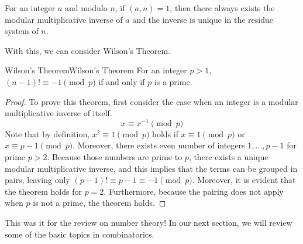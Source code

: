 \documentclass[../../main.tex]{subfiles}
\begin{document}
\begin{important}
For an integer $a$ and modulo $n$, if $(a, n) = 1$, then there
always exists the modular multiplicative inverse of $a$ and the
inverse is unique in the residue system of $n$.
\end{important}

With this, we can consider Wilson's Theorem.

\begin{theorem}{Wilson's Theorem}{Wilson's Theorem}
For an integer $p > 1$, $(n - 1)! \equiv -1 \pmod{p}$ if and only if
$p$ is a prime.
\end{theorem}
\begin{proof}
To prove this theorem, first consider the case when an integer
is a modular multiplicative inverse of itself.
\[
x \equiv x^{-1} \pmod{p}
\]
Note that by definition, $x^2 \equiv 1 \pmod{p}$ holds if
$x \equiv 1 \pmod{p}$ or $x \equiv p-1 \pmod{p}$. Moreover,
there exists even number of integers $1, \ldots, p-1$ for prime
$p > 2$. Because those numbers are prime to $p$, there exists
a unique modular multiplicative inverse, and this implies that
the terms can be grouped in pairs, leaving only $(p - 1)! \equiv
p - 1 \equiv -1 \pmod{p}$. Moreover, it is evident that the
theorem holds for $p = 2$. Furthermore, because the pairing
does not apply when $p$ is not a prime, the theorem holds.
\end{proof}

This was it for the review on number theory! In our next section,
we will review some of the basic topics in combinatorics.
\end{document}
